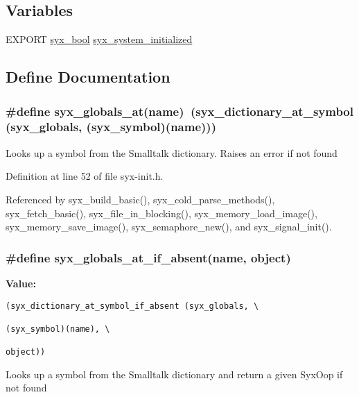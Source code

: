 \subsection*{Variables}
\begin{CompactItemize}
\item 
EXPORT \hyperlink{syx-types_8h_c6dc09b276b99fa1956364359139daab}{syx\_\-bool} \hyperlink{syx-init_8h_532ac7708947b6d7d89531593bc54492}{syx\_\-system\_\-initialized}
\end{CompactItemize}


\subsection{Define Documentation}
\hypertarget{syx-init_8h_2e08350ba0b87b6e6e85b21b23fde2c8}{
\subsubsection{\setlength{\rightskip}{0pt plus 5cm}\#define syx\_\-globals\_\-at(name)~(syx\_\-dictionary\_\-at\_\-symbol ({\bf syx\_\-globals}, ({\bf syx\_\-symbol})(name)))}}
\label{syx-init_8h_2e08350ba0b87b6e6e85b21b23fde2c8}


Looks up a symbol from the Smalltalk dictionary. Raises an error if not found 

Definition at line 52 of file syx-init.h.

Referenced by syx\_\-build\_\-basic(), syx\_\-cold\_\-parse\_\-methods(), syx\_\-fetch\_\-basic(), syx\_\-file\_\-in\_\-blocking(), syx\_\-memory\_\-load\_\-image(), syx\_\-memory\_\-save\_\-image(), syx\_\-semaphore\_\-new(), and syx\_\-signal\_\-init().\hypertarget{syx-init_8h_10821da1be539c181bf05ea3089a62b5}{
\subsubsection{\setlength{\rightskip}{0pt plus 5cm}\#define syx\_\-globals\_\-at\_\-if\_\-absent(name, \/  object)}}
\label{syx-init_8h_10821da1be539c181bf05ea3089a62b5}


\textbf{Value:}

\begin{Code}\begin{verbatim}(syx_dictionary_at_symbol_if_absent (syx_globals, \
                                                                                   (syx_symbol)(name), \
                                                                                   object))
\end{verbatim}
\end{Code}
Looks up a symbol from the Smalltalk dictionary and return a given SyxOop if not found 

